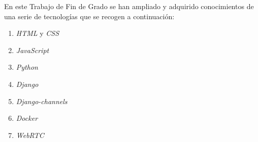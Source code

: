 \documentclass[a4paper, 12pt]{book}
\begin{document}
En este Trabajo de Fin de Grado se han ampliado y adquirido conocimientos de una serie de tecnologías que se recogen a continuación:

\begin{enumerate}
  \item \emph{HTML} y \emph{CSS}
  \item \emph{JavaScript}
  \item \emph{Python}
  \item \emph{Django}
  \item \emph{Django-channels}
  \item \emph{Docker}
  \item \emph{WebRTC}
\end{enumerate}










\cleardoublepage
\end{document}
